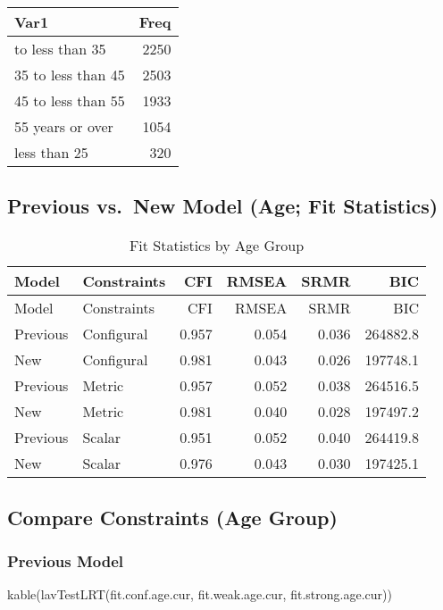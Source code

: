 \documentclass[
  letterpaper,
  DIV=11,
  numbers=noendperiod]{scrartcl}
\newenvironment{Shaded}{\begin{snugshade}}{\end{snugshade}}
\newcommand{\FunctionTok}[1]{\textcolor[rgb]{0.28,0.35,0.67}{#1}}
\newcommand{\NormalTok}[1]{\textcolor[rgb]{0.00,0.23,0.31}{#1}}
\begin{document}
\begin{longtable}[]{@{}lr@{}}
\toprule\noalign{}
Var1 & Freq \\
\midrule\noalign{}
\endhead
\bottomrule\noalign{}
\endlastfoot
25 to less than 35 & 2250 \\
35 to less than 45 & 2503 \\
45 to less than 55 & 1933 \\
55 years or over & 1054 \\
less than 25 & 320 \\
\end{longtable}

\subsection{Previous vs.~New Model (Age; Fit
Statistics)}\label{previous-vs.-new-model-age-fit-statistics}

\begin{longtable}[]{@{}llrrrr@{}}
\caption{Fit Statistics by Age Group}\tabularnewline
\toprule\noalign{}
Model & Constraints & CFI & RMSEA & SRMR & BIC \\
\midrule\noalign{}
\endfirsthead
\toprule\noalign{}
Model & Constraints & CFI & RMSEA & SRMR & BIC \\
\midrule\noalign{}
\endhead
\bottomrule\noalign{}
\endlastfoot
Previous & Configural & 0.957 & 0.054 & 0.036 & 264882.8 \\
New & Configural & 0.981 & 0.043 & 0.026 & 197748.1 \\
Previous & Metric & 0.957 & 0.052 & 0.038 & 264516.5 \\
New & Metric & 0.981 & 0.040 & 0.028 & 197497.2 \\
Previous & Scalar & 0.951 & 0.052 & 0.040 & 264419.8 \\
New & Scalar & 0.976 & 0.043 & 0.030 & 197425.1 \\
\end{longtable}

\subsection{Compare Constraints (Age
Group)}\label{compare-constraints-age-group}

\subsubsection{Previous Model}\label{previous-model-1}

\begin{Shaded}
\begin{Highlighting}[]
\FunctionTok{kable}\NormalTok{(}\FunctionTok{lavTestLRT}\NormalTok{(fit.conf.age.cur, }
\NormalTok{                 fit.weak.age.cur, }
\NormalTok{                 fit.strong.age.cur))}
\end{Highlighting}
\end{Shaded}
\end{document}
